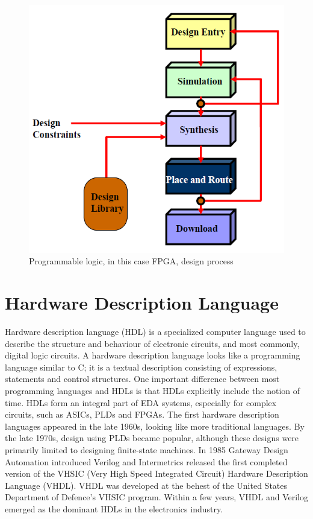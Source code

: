 \begin{figure}[H]
	\centering
	\includegraphics[width=0.6\linewidth]{IMG/ch3/FLOW}
	\caption{Programmable logic, in this case FPGA, design process}
	\label{fig:flow}
\end{figure}

\section{Hardware Description Language}
\noindent Hardware description language (HDL) is a specialized computer language used to describe the structure and behaviour of electronic circuits, and most commonly, digital logic circuits\cite{hdl}. A hardware description language looks like a programming language similar to C; it is a textual description consisting of expressions, statements and control structures. One important difference between most programming languages and HDLs is that HDLs explicitly include the notion of time.
HDLs form an integral part of EDA systems, especially for complex circuits, such as ASICs, PLDs and FPGAs.
\newline
The first hardware description languages appeared in the late 1960s, looking like more traditional languages.
By the late 1970s, design using PLDs became popular, although these designs were primarily limited to designing finite-state machines.
In 1985 Gateway Design Automation introduced Verilog and Intermetrics released the first completed version of the VHSIC (Very High Speed Integrated Circuit) Hardware Description Language (VHDL).
VHDL was developed at the behest of the United States Department of Defence's VHSIC program.
Within a few years, VHDL and Verilog emerged as the dominant HDLs in the electronics industry.
